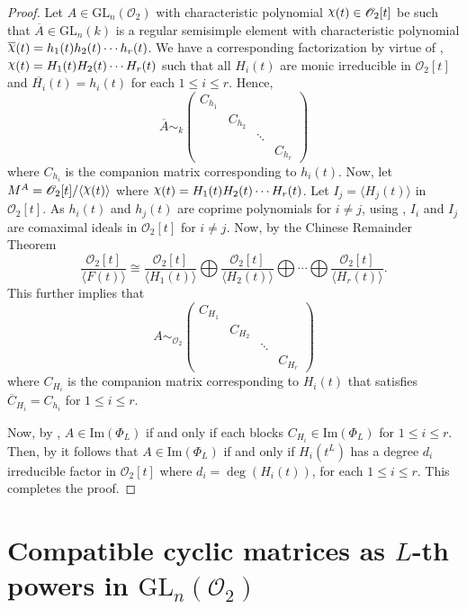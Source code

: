 \documentclass[11pt,twoside]{amsart}
\newcommand{\GL}{\mathrm{GL}}
\newcommand{\im}{\mathrm{Im}}
\newcommand{\upchi}{\raisebox{0.4ex}{$\chi$}}
\newcommand{\Char}{\upchi}
\newcommand{\R}{\mathscr{O}_2}
\theoremstyle{definition} %
\begin{document}
\begin{proof}
Let $A\in \GL_n(\R)$ with characteristic polynomial $\Char(t)\in \R[t]$ be such that $\overline{A} \in\GL_n(k)$ is a regular semisimple element with characteristic polynomial $\overline{\Char}(t) = h_1(t)h_2(t)\cdots h_r(t)$. 
We have a corresponding factorization by virtue of , $\Char(t) = H_1(t)H_2(t)\cdots H_r(t)$ such that all $H_i(t)$ are monic irreducible in $\R[t]$ and $\overline{H_i}(t) = h_i(t)$ for each $1\leq i\leq r$. 
Hence, 
$$\overline{A} \sim_k \begin{pmatrix}  %
{C}_{h_1} & & & \\ & {C}_{h_2} & & \\ & & \ddots & \\ & & & {C}_{h_r} \end{pmatrix}$$
where $C_{h_i}$ is the companion matrix corresponding to $h_i(t)$. Now, let $M^A = \R[t]/\langle \Char(t)\rangle$ where $\Char(t)=H_1(t)H_2(t)\cdots H_r(t)$. Let $I_j=\langle H_j(t) \rangle$ in $\R[t]$. 
As $h_i(t)$ and $h_j(t)$ are coprime polynomials for $i\neq j$, using , $I_i$ and $I_j$ are comaximal ideals in $\R[t]$ for $i\neq j$. Now, by the Chinese Remainder Theorem 
$$\dfrac{\R[t]}{\langle F(t)\rangle } \cong \dfrac{\R[t]}{\langle H_1(t)\rangle}\bigoplus \dfrac{\R[t]}{\langle H_2(t)\rangle}\bigoplus \cdots \bigoplus \dfrac{\R[t]}{\langle H_r(t)\rangle}.$$ 
This further implies that 
$$A\sim_{\R} \begin{pmatrix}  %
C_{H_1} &  & & \\ & C_{H_2} & & \\ & & \ddots & \\ &   & & C_{H_r} \end{pmatrix}$$
where $C_{H_i}$ is the companion matrix corresponding to $H_i(t)$ that satisfies ${\overline C}_{H_i}=C_{h_i}$ for $1\leq i\leq r$.

Now, by , $A\in \im(\Phi_L)$ if and only if each blocks $C_{H_i}\in \im(\Phi_L)$ for $1\leq i\leq r$. Then, by  it follows that  $A\in \im(\Phi_L)$ if and only if  $H_i(t^L)$ has a degree $d_i$ irreducible factor in $\R[t]$ where $d_i=\deg(H_i(t))$, for each $1\leq i\leq r$. This completes the proof.
\end{proof}



\section{Compatible cyclic matrices as $L$-th powers in $\GL_n(\R)$}\label{sec:cyc}
\end{document}
